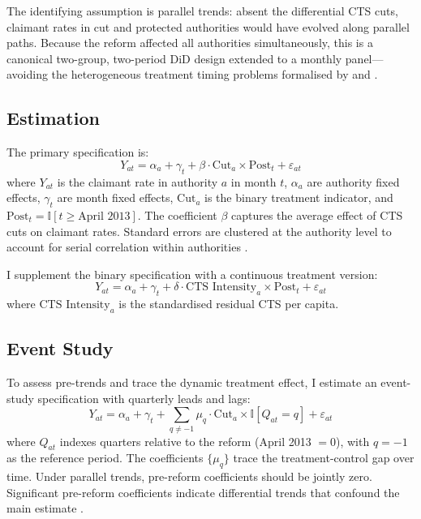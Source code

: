 \documentclass[12pt]{article}
\newcommand{\ind}{\mathbb{I}}
\begin{document}
The identifying assumption is parallel trends: absent the differential CTS cuts, claimant rates in cut and protected authorities would have evolved along parallel paths. Because the reform affected all authorities simultaneously, this is a canonical two-group, two-period DiD design extended to a monthly panel---avoiding the heterogeneous treatment timing problems formalised by \citet{goodmanbacon2021difference} and \citet{dechaisemartin2020two}.

\subsection{Estimation}

The primary specification is:
\begin{equation}
\label{eq:main}
Y_{at} = \alpha_a + \gamma_t + \beta \cdot \text{Cut}_a \times \text{Post}_t + \varepsilon_{at}
\end{equation}
where $Y_{at}$ is the claimant rate in authority $a$ in month $t$, $\alpha_a$ are authority fixed effects, $\gamma_t$ are month fixed effects, $\text{Cut}_a$ is the binary treatment indicator, and $\text{Post}_t = \ind[t \geq \text{April 2013}]$. The coefficient $\beta$ captures the average effect of CTS cuts on claimant rates. Standard errors are clustered at the authority level to account for serial correlation within authorities \citep{angrist1999empirical}.

I supplement the binary specification with a continuous treatment version:
\begin{equation}
Y_{at} = \alpha_a + \gamma_t + \delta \cdot \text{CTS Intensity}_a \times \text{Post}_t + \varepsilon_{at}
\end{equation}
where $\text{CTS Intensity}_a$ is the standardised residual CTS per capita.

\subsection{Event Study}

To assess pre-trends and trace the dynamic treatment effect, I estimate an event-study specification with quarterly leads and lags:
\begin{equation}
\label{eq:eventstudy}
Y_{at} = \alpha_a + \gamma_t + \sum_{q \neq -1} \mu_q \cdot \text{Cut}_a \times \ind[Q_{at} = q] + \varepsilon_{at}
\end{equation}
where $Q_{at}$ indexes quarters relative to the reform (April 2013 $= 0$), with $q = -1$ as the reference period. The coefficients $\{\mu_q\}$ trace the treatment-control gap over time. Under parallel trends, pre-reform coefficients should be jointly zero. Significant pre-reform coefficients indicate differential trends that confound the main estimate \citep{roth2023pretest}.
\end{document}
